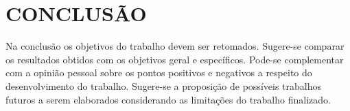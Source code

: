 
\chapter{CONCLUSÃO} %
\label{conclusao}

Na conclusão os objetivos do trabalho devem ser retomados. Sugere-se comparar os resultados obtidos com os objetivos geral e específicos. Pode-se complementar com a opinião pessoal sobre os pontos positivos e negativos a respeito do desenvolvimento do trabalho. Sugere-se a proposição de possíveis trabalhos futuros a serem elaborados considerando as limitações do trabalho finalizado.
